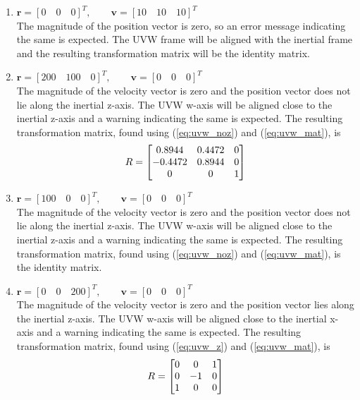 \documentclass[11pt,fleqn]{report}
\begin{document}
\begin{enumerate}
 \item $\textbf{r} = [0 \quad 0 \quad 0]^T, \qquad
 \textbf{v} = [10 \quad 10 \quad 10]^T$ \\
 The magnitude of the position vector is zero, so an error message
 indicating the same is expected. The UVW frame will be aligned with
 the inertial frame and the resulting transformation matrix will be
 the identity matrix.

 \item $\textbf{r} = [200 \quad 100 \quad 0]^T, \qquad
 \textbf{v} = [0 \quad 0 \quad 0]^T$ \\
 The magnitude of the velocity vector is zero and the position vector
 does not lie along the inertial z-axis. The UVW w-axis will be
 aligned close to the inertial z-axis and a warning indicating the
 same is expected. The resulting transformation matrix, found using
 (\ref{eq:uvw_noz}) and (\ref{eq:uvw_mat}), is
 \begin{equation*}
\hfill R = \begin{bmatrix} 0.8944 & 0.4472 & 0 \\
-0.4472 & 0.8944 & 0 \\
 0& 0& 1
 \end{bmatrix} \hfill
 \end{equation*}

 \item $\textbf{r} = [100 \quad 0 \quad 0]^T, \qquad
\textbf{v} = [0 \quad 0 \quad 0]^T$ \\
 The magnitude of the velocity vector is zero and the position
 vector does not lie along the inertial z-axis. The UVW w-axis
 will be aligned close to the inertial z-axis and a warning
 indicating the same is expected. The resulting transformation matrix,
 found using (\ref{eq:uvw_noz}) and (\ref{eq:uvw_mat}), is the
 identity matrix.

 \item $\textbf{r} = [0 \quad 0 \quad 200]^T, \qquad
\textbf{v} = [0 \quad 0 \quad 0]^T$ \\
 The magnitude of the velocity vector is zero and the position vector
 lies along the inertial z-axis. The UVW w-axis will be aligned close
 to the inertial x-axis and a warning indicating the same is expected.
 The resulting transformation matrix, found using (\ref{eq:uvw_z})
 and (\ref{eq:uvw_mat}), is
 \begin{equation*}
\hfill R = \begin{bmatrix} 0 &0 & 1 \\
 0 & -1 & 0 \\
 1 &0 & 0
 \end{bmatrix} \hfill
 \end{equation*}


\end{enumerate}
\end{document}
